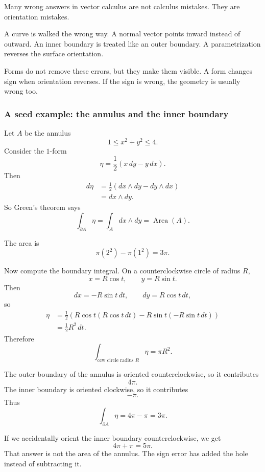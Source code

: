 Many wrong answers in vector calculus are not calculus mistakes.  They are orientation
mistakes.

A curve is walked the wrong way.  A normal vector points inward instead of outward.
An inner boundary is treated like an outer boundary.  A parametrization reverses the
surface orientation.

Forms do not remove these errors, but they make them visible.  A form changes sign
when orientation reverses.  If the sign is wrong, the geometry is usually wrong too.

\subsubsection*{A seed example: the annulus and the inner boundary}

Let \(A\) be the annulus
\[
    1\le x^2+y^2\le4.
\]
Consider the \(1\)-form
\[
\boxed{
    \eta=\frac12(x\,dy-y\,dx).
}
\]
Then
\[
\begin{aligned}
d\eta
&=
\frac12(dx\wedge dy-dy\wedge dx)\\
&=
dx\wedge dy.
\end{aligned}
\]
So Green's theorem says
\[
\boxed{
    \int_{\partial A}\eta
    =
    \int_A dx\wedge dy
    =
    \operatorname{Area}(A).
}
\]

The area is
\[
    \pi(2^2)-\pi(1^2)=3\pi.
\]

Now compute the boundary integral.  On a counterclockwise circle of radius \(R\),
\[
    x=R\cos t,\qquad y=R\sin t.
\]
Then
\[
    dx=-R\sin t\,dt,
    \qquad
    dy=R\cos t\,dt,
\]
so
\[
\begin{aligned}
    \eta
    &=
    \frac12
    \left(
        R\cos t(R\cos t\,dt)
        -
        R\sin t(-R\sin t\,dt)
    \right)\\
    &=
    \frac12R^2\,dt.
\end{aligned}
\]
Therefore
\[
    \int_{\text{ccw circle radius }R}\eta
    =
    \pi R^2.
\]

The outer boundary of the annulus is oriented counterclockwise, so it contributes
\[
    4\pi.
\]
The inner boundary is oriented clockwise, so it contributes
\[
    -\pi.
\]
Thus
\[
\boxed{
    \int_{\partial A}\eta=4\pi-\pi=3\pi.
}
\]

If we accidentally orient the inner boundary counterclockwise, we get
\[
    4\pi+\pi=5\pi.
\]
That answer is not the area of the annulus.  The sign error has added the hole instead
of subtracting it.

